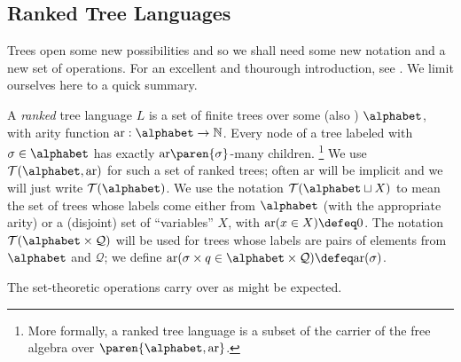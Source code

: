 \subsection{Ranked Tree Languages}

Trees open some new possibilities and so we shall need some new notation and
a new set of operations.  For an excellent and thourough introduction, see
\cite[Preliminaries]{tata}.  We limit ourselves here to a quick summary.

A {\em ranked} tree language $L$ is a set of finite trees over some
 (also ) $\alphabet$, with arity function
$\mbox{ar} : \alphabet \to \mathbb{N}$.  Every node of a tree labeled with
$\sigma \in \alphabet$ has exactly $\mbox{ar}\paren{\sigma}$-many children.%
%
\footnote{More formally, a ranked tree language is a subset of the carrier
of the free algebra over $\paren{\alphabet,\mbox{ar}}$.} We use
$\mathcal{T}(\alphabet,\mbox{ar})$ for such a set of ranked trees; often
$\mbox{ar}$ will be implicit and we will just write $\mathcal{T}(\alphabet)$.
We use the notation $\mathcal{T}(\alphabet \sqcup X)$ to mean the set of trees
whose labels come either from $\alphabet$ (with the appropriate arity) or a
(disjoint) set of ``variables'' $X$, with $\mbox{ar}(x \in X) \defeq 0$.
The notation $\mathcal{T}(\alphabet \times \mathcal{Q})$ will be used for trees
whose labels are pairs of elements from $\alphabet$ and $\mathcal{Q}$; we
define $\mbox{ar}(\sigma \times q \in \alphabet \times \mathcal{Q}) \defeq
\mbox{ar}(\sigma)$.

The set-theoretic operations carry over as might be expected.
